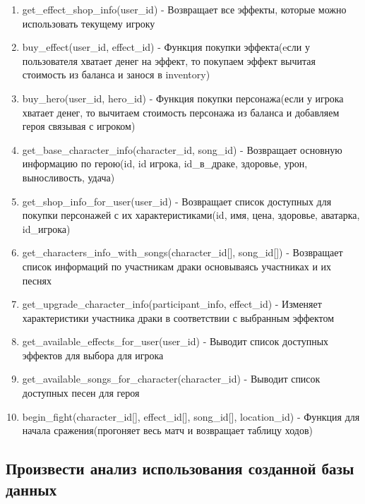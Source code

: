 \begin{enumerate}
    \item get\_effect\_shop\_info(user\_id) 
    - Возвращает все эффекты, которые можно использовать текущему игроку

    \item buy\_effect(user\_id, effect\_id)
    - Функция покупки эффекта(eсли у пользователя хватает денег на эффект, то покупаем эффект вычитая стоимость из баланса и занося в inventory)

    \item buy\_hero(user\_id, hero\_id)
    - Функция покупки персонажа(если у игрока хватает денег, то вычитаем стоимость персонажа из баланса и добавляем героя связывая с игроком)

    \item get\_base\_character\_info(character\_id, song\_id)
    - Возвращает основную информацию по герою(id, id игрока, id\_в\_драке, здоровье, урон, выносливость, удача)

    \item get\_shop\_info\_for\_user(user\_id)
    - Возвращает список доступных для покупки персонажей с их характеристиками(id, имя, цена, здоровье, аватарка, id\_игрока)

    \item get\_characters\_info\_with\_songs(character\_id[], song\_id[])
    - Возвращает список информаций по участникам драки основываясь участниках и их песнях

    \item get\_upgrade\_character\_info(participant\_info, effect\_id)
    - Изменяет характеристики участника драки в соответствии с выбранным эффектом

    \item get\_available\_effects\_for\_user(user\_id)
    - Выводит список доступных эффектов для выбора для игрока

    \item get\_available\_songs\_for\_character(character\_id)
    - Выводит список доступных песен для героя

    \item begin\_fight(character\_id[], effect\_id[], song\_id[], location\_id)
    - Функция для начала сражения(прогоняет весь матч и возвращает таблицу ходов)

\end{enumerate}


\subsection*{Произвести анализ использования созданной базы данных}

